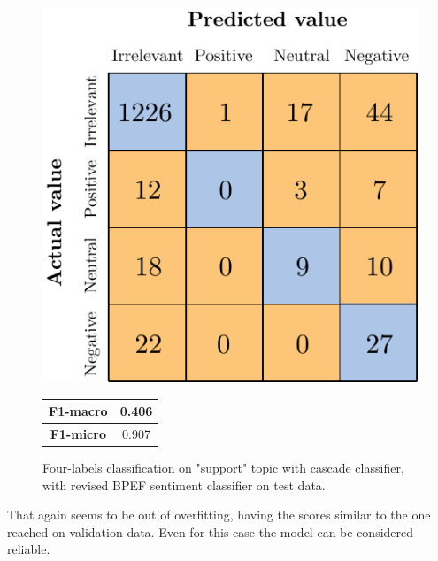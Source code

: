 \begin{figure}[H]
	\begin{minipage}[b]{0.6\linewidth}
		\centering
		\includegraphics[scale=1]{figures/conf_matrices/ita_support/ita_cascade_support_bpef_tst.pdf}
	\end{minipage}
	\begin{minipage}[b]{0.3\linewidth}
		\begin{tabular}[b]{ | c | c | } 
			\hline
			\textbf{F1-macro} & 0.406 \\
			\hline
			\textbf{F1-micro} & 0.907 \\ 
			\hline
		\end{tabular}
	\end{minipage}
	\caption{Four-labels classification on "support" topic with cascade classifier, with revised BPEF sentiment classifier on test data.}
	\label{fig:ita_cascade_support_bpef_tst}
\end{figure}


That again seems to be out of overfitting, having the scores similar to the one reached on validation data. Even for this case the model can be considered reliable.

